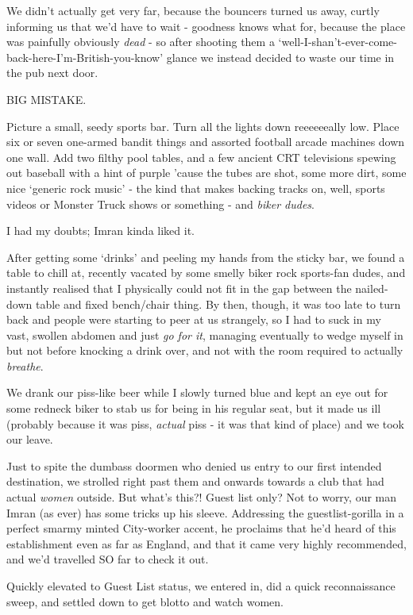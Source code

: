 \documentclass[a5paper,10pt,titlepage,draft]{book}
\begin{document}
We didn't actually get very far, because the bouncers turned us away, curtly informing us that we'd have to wait - goodness knows what for, because the place was painfully obviously \emph{dead} - so after shooting them a `well-I-shan't-ever-come-back-here-I'm-British-you-know' glance we instead decided to waste our time in the pub next door.

BIG MISTAKE.

Picture a small, seedy sports bar.  Turn all the lights down reeeeeeally low.  Place six or seven one-armed bandit things and assorted football arcade machines down one wall.  Add two filthy pool tables, and a few ancient CRT televisions spewing out baseball with a hint of purple 'cause the tubes are shot, some more dirt, some nice `generic rock music' - the kind that makes backing tracks on, well, sports videos or Monster Truck shows or something - and \emph{biker dudes}.

I had my doubts; Imran kinda liked it.

After getting some `drinks' and peeling my hands from the sticky bar, we found a table to chill at, recently vacated by some smelly biker rock sports-fan dudes, and instantly realised that I physically could not fit in the gap between the nailed-down table and fixed bench/chair thing.  By then, though, it was too late to turn back and people were starting to peer at us strangely, so I had to suck in my vast, swollen abdomen and just \emph{go for it}, managing eventually to wedge myself in but not before knocking a drink over, and not with the room required to actually \emph{breathe}.

We drank our piss-like beer while I slowly turned blue and kept an eye out for some redneck biker to stab us for being in his regular seat, but it made us ill (probably because it was piss, \emph{actual} piss - it was that kind of place) and we took our leave.

Just to spite the dumbass doormen who denied us entry to our first intended destination, we strolled right past them and onwards towards a club that had actual \emph{women} outside.  But what's this?!  Guest list only?  Not to worry, our man Imran (as ever) has some tricks up his sleeve.  Addressing the guestlist-gorilla in a perfect smarmy minted City-worker accent, he proclaims that he'd heard of this establishment even as far as England, and that it came very highly recommended, and we'd travelled SO far to check it out.

Quickly elevated to Guest List status, we entered in, did a quick reconnaissance sweep, and settled down to get blotto and watch women.
\end{document}
